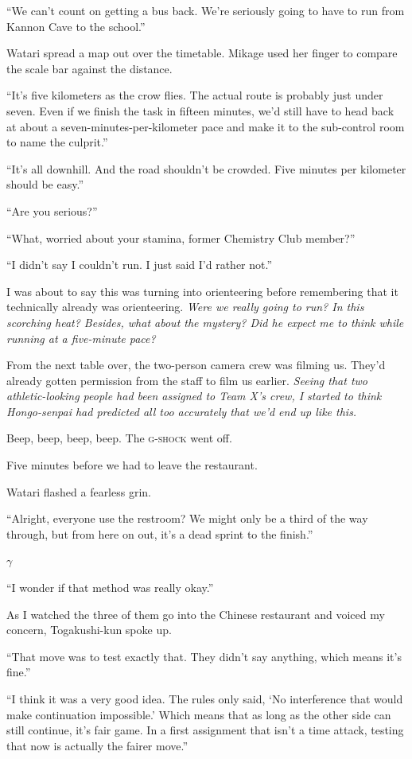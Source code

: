 \documentclass[
    a4paper,
    12pt,
    twoside,
    openany,
    UTF8,
    fontset=windows
]{ctexbook}
\begin{document}
``We can't count on getting a bus back. We're seriously going to have to run from Kannon Cave to the school.''

Watari spread a map out over the timetable. Mikage used her finger to compare the scale bar against the distance.

``It's five kilometers as the crow flies. The actual route is probably just under seven. Even if we finish the task in fifteen minutes, we'd still have to head back at about a seven-minutes-per-kilometer pace and make it to the sub-control room to name the culprit.''

``It's all downhill. And the road shouldn't be crowded. Five minutes per kilometer should be easy.''

``Are you serious?''

``What, worried about your stamina, former Chemistry Club member?''

``I didn't say I couldn't run. I just said I'd rather not.''

I was about to say this was turning into orienteering before remembering that it technically already was orienteering. \textit{Were we really going to run? In this scorching heat? Besides, what about the mystery? Did he expect me to think while running at a five-minute pace?}

From the next table over, the two-person camera crew was filming us. They'd already gotten permission from the staff to film us earlier. \textit{Seeing that two athletic-looking people had been assigned to Team X's crew, I started to think Hongo-senpai had predicted all too accurately that we'd end up like this.}

Beep, beep, beep, beep. The \textsc{g-shock} went off.

Five minutes before we had to leave the restaurant.

Watari flashed a fearless grin.

``Alright, everyone use the restroom? We might only be a third of the way through, but from here on out, it's a dead sprint to the finish.''

$\gamma$

``I wonder if that method was really okay.''

As I watched the three of them go into the Chinese restaurant and voiced my concern, Togakushi-kun spoke up.

``That move was to test exactly that. They didn't say anything, which means it's fine.''

``I think it was a very good idea. The rules only said, `No interference that would make continuation impossible.' Which means that as long as the other side can still continue, it's fair game. In a first assignment that isn't a time attack, testing that now is actually the fairer move.''
\end{document}
